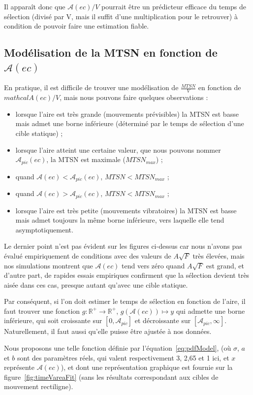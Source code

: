 	Il apparaît donc que $\mathcal{A}(ec)/V$ pourrait être un prédicteur efficace du temps de sélection (divisé par V, mais il suffit d'une multiplication pour le retrouver) à condition de pouvoir faire une estimation fiable.
	
	
	\subsection{Modélisation de la MTSN en fonction de $\mathcal{A}(ec)$}
	En pratique, il est difficile de trouver une modélisation de $\frac{MTSN}{V}$ en fonction de $mathcal{A}(ec)/V$, mais nous pouvons faire quelques observations :
	
	\begin{itemize}
		\item lorsque l'aire est très grande (mouvements prévisibles) la MTSN est basse mais admet une borne inférieure (déterminé par le temps de sélection d'une cible statique) ;
		\item lorsque l'aire atteint une certaine valeur, que nous pouvons nommer $\mathcal{A}_{pic}(ec)$, la MTSN est maximale ($MTSN_{max}$) ;
		\item quand $\mathcal{A}(ec) < \mathcal{A}_{pic}(ec)$, $MTSN < MTSN_{max}$ ;
		\item quand $\mathcal{A}(ec) > \mathcal{A}_{pic}(ec)$, $MTSN < MTSN_{max}$ ;
		\item lorsque l'aire est très petite (mouvements vibratoires) la MTSN est basse mais admet toujours la même borne inférieure, vers laquelle elle tend asymptotiquement.
	\end{itemize}
	
	Le dernier point n'est pas évident sur les figures ci-dessus car nous n'avons pas évalué empiriquement de conditions avec des valeurs de $A\sqrt{F}$ très élevées, mais nos simulations montrent que $\mathcal{A}(ec)$ tend vers zéro quand $A\sqrt{F}$ est grand, et d'autre part, de rapides essais empiriques confirment que la sélection devient très aisée dans ces cas, presque autant qu'avec une cible statique.
	
	Par conséquent, si l'on doit estimer le temps de sélection en fonction de l'aire, il faut trouver une fonction $g : \mathbb{R}^{+} \to \mathbb{R}^{+}$, $g\left(\mathcal{A}(ec)\right) \mapsto y$ qui admette une borne inférieure, qui soit croissante sur $[0, \mathcal{A}_{pic}]$ et décroissante sur $[\mathcal{A}_{pic}, \infty]$. Naturellement, il faut aussi qu'elle puisse être ajustée à nos données.
	
	Nous proposons une telle fonction définie par l'équation~\ref{eq:pdfModel}, (où $\sigma$, $a$ et $b$ sont des paramètres réels, qui valent respectivement 3, 2,65 et 1 ici, et $x$ représente $\mathcal{A}(ec)$), et dont une représentation graphique est fournie sur la figure~\ref{fig:timeVareaFit} (sans les résultats correspondant aux cibles de mouvement rectiligne).
	
